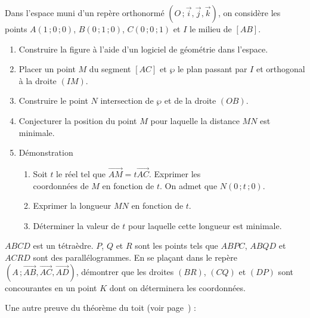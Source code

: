 \documentclass{cornouaille}
\begin{document}
\begin{colonne*exercice}
  \begin{exercice}[][\tice]
    Dans l'espace muni d'un repère orthonormé
    $(O\,;\vec{i},\vec{j},\vec{k})$, on considère les points
    $A(1\,;0\,;0)$, $B(0\,;1\,;0)$, $C(0\,;0\,;1)$ et $I$ le milieu de
    $[AB]$.
    \begin{enumerate}
    \item Construire la figure à l'aide d'un logiciel de géométrie dans
      l'espace.
    \item Placer un point $M$ du segment $[AC]$ et $\wp$ le plan passant
      par $I$ et orthogonal à la droite $(IM)$.
    \item Construire le point $N$ intersection de $\wp$ et de la droite
      $(OB)$.
    \item Conjecturer la position du point $M$ pour laquelle la distance
      $MN$ est minimale.
    \item Démonstration
      \begin{enumerate}
      \item Soit $t$ le réel tel que
        $\overrightarrow{AM}=t\overrightarrow{AC}$. Exprimer les\\
        coordonnées de $M$ en fonction de $t$. On admet que $N(0\,;t\,;0)$.
      \item Exprimer la longueur $MN$ en fonction de $t$.
      \item Déterminer la valeur de $t$ pour laquelle cette longueur est
        minimale.
      \end{enumerate}
    \end{enumerate}
  \end{exercice}

  \begin{exercice}
    $ABCD$ est un tétraèdre. $P$, $Q$ et $R$ sont les points tels que
    $ABPC$, $ABQD$ et $ACRD$ sont des parallélogrammes.  En se plaçant
    dans le repère
    $(A\,;\overrightarrow{AB},\overrightarrow{AC},\overrightarrow{AD})$,
    démontrer que les droites $(BR)$, $(CQ)$ et $(DP)$ sont
    concourantes en un point $K$ dont on déterminera les coordonnées.
  \end{exercice}

  \begin{exercice}\label{ex71G2}
    Une autre preuve du théorème du toit (voir page~\pageref{G2theoremedutoit}) :

    \begin{center}
      
    \end{center}


\end{exercice}
\end{colonne*exercice}
\end{document}
